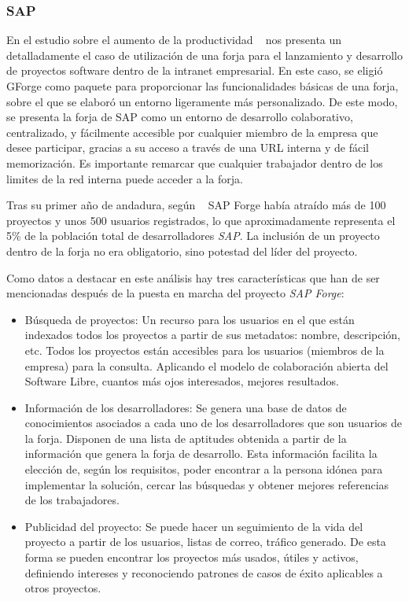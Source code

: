 \subsubsection{SAP}
\label{subsub:sap}

\par En el estudio sobre el aumento de la productividad ~\cite{open-collaboration-forges} nos presenta un detalladamente el caso de utilización de una forja para el lanzamiento y desarrollo de proyectos software dentro de la intranet empresarial. En este caso, se eligió GForge como paquete para proporcionar las funcionalidades básicas de una forja, sobre el que se elaboró un entorno ligeramente más personalizado. De este modo, se presenta la forja de SAP como un entorno de desarrollo colaborativo, centralizado, y fácilmente accesible por cualquier miembro de la empresa que desee participar, gracias a su acceso a través de una URL interna y de fácil memorización. Es importante remarcar que cualquier trabajador dentro de los limites de la red interna puede acceder a la forja.

\par Tras su primer año de andadura, según ~\cite{open-collaboration-forges} SAP Forge había atraído más de 100 proyectos y unos 500 usuarios registrados, lo que aproximadamente representa el 5\% de la población total de desarrolladores \emph{SAP}. La inclusión de un proyecto dentro de la forja no era obligatorio, sino potestad del líder del proyecto.

\par Como datos a destacar en este análisis hay tres características que han de ser mencionadas después de la puesta en marcha del proyecto \emph{SAP Forge}:

\begin{itemize}
	\item Búsqueda de proyectos: Un recurso para los usuarios en el que están indexados todos los proyectos a partir de sus metadatos: nombre, descripción, etc. Todos los proyectos están accesibles para los usuarios (miembros de la empresa) para la consulta. Aplicando el modelo de colaboración abierta del Software Libre, cuantos más ojos interesados, mejores resultados.
	
	\item Información de los desarrolladores: Se genera una base de datos de conocimientos asociados a cada uno de los desarrolladores que son usuarios de la forja. Disponen de una lista de aptitudes obtenida a partir de la información que genera la forja de desarrollo. Esta información facilita la elección de, según los requisitos, poder encontrar a la persona idónea para implementar la solución, cercar las búsquedas y obtener mejores referencias de los trabajadores.
	
	\item Publicidad del proyecto: Se puede hacer un seguimiento de la vida del proyecto a partir de los usuarios, listas de correo, tráfico generado. De esta forma se pueden encontrar los proyectos más usados, útiles y activos, definiendo intereses y reconociendo patrones de casos de éxito aplicables a otros proyectos.
	
\end{itemize}

